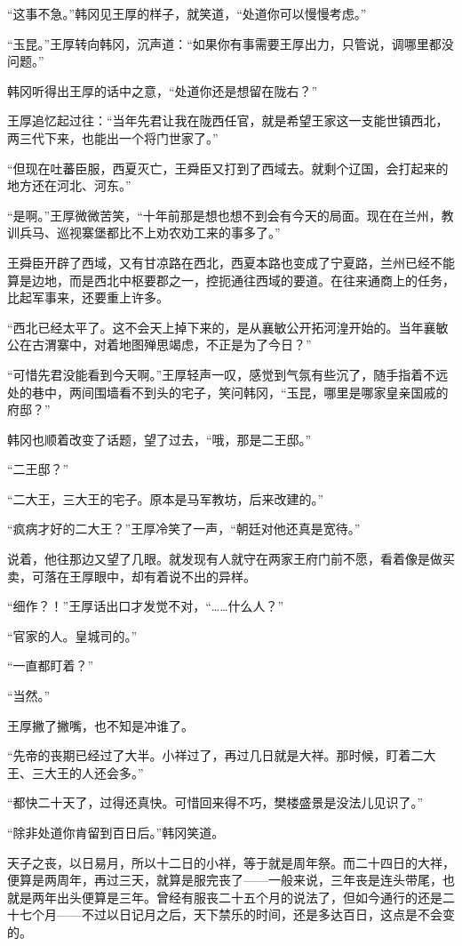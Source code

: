 “这事不急。”韩冈见王厚的样子，就笑道，“处道你可以慢慢考虑。”

“玉昆。”王厚转向韩冈，沉声道：“如果你有事需要王厚出力，只管说，调哪里都没问题。”

韩冈听得出王厚的话中之意，“处道你还是想留在陇右？”

王厚追忆起过往：“当年先君让我在陇西任官，就是希望王家这一支能世镇西北，两三代下来，也能出一个将门世家了。”

“但现在吐蕃臣服，西夏灭亡，王舜臣又打到了西域去。就剩个辽国，会打起来的地方还在河北、河东。”

“是啊。”王厚微微苦笑，“十年前那是想也想不到会有今天的局面。现在在兰州，教训兵马、巡视寨堡都比不上劝农劝工来的事多了。”

王舜臣开辟了西域，又有甘凉路在西北，西夏本路也变成了宁夏路，兰州已经不能算是边地，而是西北中枢要郡之一，控扼通往西域的要道。在往来通商上的任务，比起军事来，还要重上许多。

“西北已经太平了。这不会天上掉下来的，是从襄敏公开拓河湟开始的。当年襄敏公在古渭寨中，对着地图殚思竭虑，不正是为了今日？”

“可惜先君没能看到今天啊。”王厚轻声一叹，感觉到气氛有些沉了，随手指着不远处的巷中，两间围墙看不到头的宅子，笑问韩冈，“玉昆，哪里是哪家皇亲国戚的府邸？”

韩冈也顺着改变了话题，望了过去，“哦，那是二王邸。”

“二王邸？”

“二大王，三大王的宅子。原本是马军教坊，后来改建的。”

“疯病才好的二大王？”王厚冷笑了一声，“朝廷对他还真是宽待。”

说着，他往那边又望了几眼。就发现有人就守在两家王府门前不愿，看着像是做买卖，可落在王厚眼中，却有着说不出的异样。

“细作？！”王厚话出口才发觉不对，“……什么人？”

“官家的人。皇城司的。”

“一直都盯着？”

“当然。”

王厚撇了撇嘴，也不知是冲谁了。

“先帝的丧期已经过了大半。小祥过了，再过几日就是大祥。那时候，盯着二大王、三大王的人还会多。”

“都快二十天了，过得还真快。可惜回来得不巧，樊楼盛景是没法儿见识了。”

“除非处道你肯留到百日后。”韩冈笑道。

天子之丧，以日易月，所以十二日的小祥，等于就是周年祭。而二十四日的大祥，便算是两周年，再过三天，就算是服完丧了——一般来说，三年丧是连头带尾，也就是两年出头便算是三年。曾经有服丧二十五个月的说法了，但如今通行的还是二十七个月——不过以日记月之后，天下禁乐的时间，还是多达百日，这点是不会变的。

